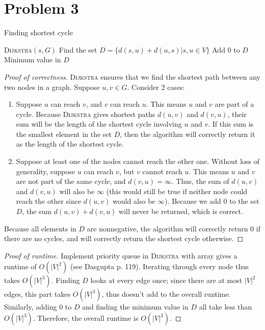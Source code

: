\documentclass{article}
\begin{document}
\section*{Problem 3}
\begin{algorithm}
\caption{Finding shortest cycle}
\begin{algorithmic}[1]
	\State \textsc{Dijkstra}$(s,G)$ 
\EndFor
\State Find the set $D = \{d(s,u)+d(u,s)|s,u\in V\}$
\State Add 0 to $D$
\State \Return Minimum value in $D$
\EndFunction

\end{algorithmic}
\end{algorithm}

\begin{proof}[Proof of correctness]
\textsc{Dijkstra} ensures that we find the shortest path between any two nodes in a graph. Suppose $u,v \in G$. Consider 2 cases:
\begin{enumerate}
	\item Suppose $u$ can reach $v$, and $v$ can reach $u$. This means $u$ and $v$ are part of a cycle. Because \textsc{Dijkstra} gives shortest paths $d(u,v)$ and $d(v,u)$, their sum will be the length of the shortest cycle involving $u$ and $v$. If this sum is the smallest element in the set $D$, then the algorithm will correctly return it as the length of the shortest cycle.
	
	\item Suppose at least one of the nodes cannot reach the other one. Without loss of generality, suppose $u$ can reach $v$, but $v$ cannot reach $u$. This means $u$ and $v$ are not part of the same cycle, and $d(v,u)=\infty$. Thus, the sum of $d(u,v)$ and $d(v,u)$ will also be $\infty$ (this would still be true if neither node could reach the other since $d(u,v)$ would also be $\infty$). Because we add 0 to the set $D$, the sum $d(u,v)+d(v,u)$ will never be returned, which is correct.
\end{enumerate}
Because all elements in $D$ are nonnegative, the algorithm will correctly return 0 if there are no cycles, and will correctly return the shortest cycle otherwise.
\end{proof}

\begin{proof}[Proof of runtime]
Implement priority queue in \textsc{Dijkstra} with array gives a runtime of $O(|V|^2)$ (see Dasgupta p. 119). Iterating through every node thus takes $O(|V|^3)$. Finding $D$ looks at every edge once; since there are at most $|V|^2$ edges, this part takes $O(|V|^3)$, thus doesn't add to the overall runtime. Similarly, adding 0 to $D$ and finding the minimum value in $D$ all take less than $O(|V|^3)$. Therefore, the overall runtime is $O(|V|^3)$.
\end{proof}
\end{document}
